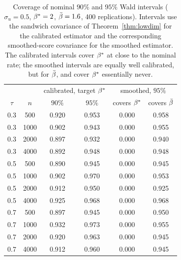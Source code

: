 \begin{table}[ht]
\centering
\small
\caption{Coverage of nominal $90\%$ and $95\%$ Wald intervals ($\sigma_u=0.5$, $\beta^*=2$, $\bar{\beta}=1.6$, 400 replications). Intervals use the sandwich covariance of Theorem~\ref{thm:lowdim} for the calibrated estimator and the corresponding smoothed-score covariance for the smoothed estimator. The calibrated intervals cover $\beta^*$ at close to the nominal rate; the smoothed intervals are equally well calibrated, but for $\bar{\beta}$, and cover $\beta^*$ essentially never.}
\label{tab:coverage}
\begin{tabular}{cccccc}
\toprule
& & \multicolumn{2}{c}{calibrated, target $\beta^*$} & \multicolumn{2}{c}{smoothed, $95\%$} \\
$\tau$ & $n$ & $90\%$ & $95\%$ & covers $\beta^*$ & covers $\bar{\beta}$ \\
\midrule
0.3 & 500 & 0.920 & 0.953 & 0.000 & 0.958 \\
0.3 & 1000 & 0.902 & 0.943 & 0.000 & 0.955 \\
0.3 & 2000 & 0.897 & 0.932 & 0.000 & 0.940 \\
0.3 & 4000 & 0.892 & 0.948 & 0.000 & 0.948 \\
0.5 & 500 & 0.890 & 0.945 & 0.000 & 0.945 \\
0.5 & 1000 & 0.902 & 0.970 & 0.000 & 0.953 \\
0.5 & 2000 & 0.912 & 0.950 & 0.000 & 0.925 \\
0.5 & 4000 & 0.925 & 0.968 & 0.000 & 0.968 \\
0.7 & 500 & 0.897 & 0.945 & 0.000 & 0.950 \\
0.7 & 1000 & 0.932 & 0.973 & 0.000 & 0.955 \\
0.7 & 2000 & 0.920 & 0.963 & 0.000 & 0.945 \\
0.7 & 4000 & 0.912 & 0.960 & 0.000 & 0.945 \\
\bottomrule
\end{tabular}
\end{table}
